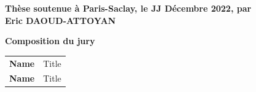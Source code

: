 \documentclass[12pt, a4paper]{book}
\begin{document}
\begin{titlepage}
  \textbf{Thèse soutenue à Paris-Saclay, le JJ Décembre 2022, par}\\
  \bigskip
  \Large {\color{Prune} \textbf{Eric DAOUD-ATTOYAN}} %

  \vspace{\fill} %

  \bigskip


  \flushleft
  \small \textbf{Composition du jury}\\
  \vspace{2mm}
  \scriptsize
  \begin{tabular}{|p{7cm}l}
    \arrayrulecolor{Prune}

    \textbf{Name} & Title \\
    \textbf{Name} & Title \\
  \end{tabular}

\end{titlepage}



\begin{singlespace}
  
\end{singlespace}



\tableofcontents





\begin{singlespace}

  

\end{singlespace}
\end{document}
